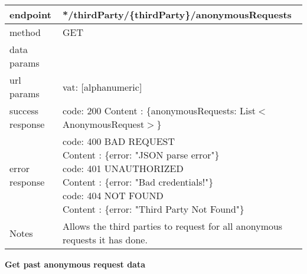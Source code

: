 	\begin{tabularx}{\linewidth}{| l| l }
		\hline
		endpoint & */thirdParty/\{thirdParty\}/anonymousRequests \\
		\hline
		method & GET \\
		\hline
		data params & \\
		\hline
		url params &
		\parbox{0.7\textwidth}{
			\bigskip
			vat: [alphanumeric]
			\bigskip
		} \\
		\hline
		success response &
		\parbox{0.7\textwidth}{
			\bigskip
			code: 200\\
			Content : \{anonymousRequests: List$<$AnonymousRequest$>$\}
			\bigskip
		} \\
		\hline
		error response &
		\parbox{0.7\textwidth}{
			\bigskip
			code: 400 BAD REQUEST \\
			Content : \{error: "JSON parse error"\}\\
			code: 401 UNAUTHORIZED \\
			Content : \{error: "Bad credentials!"\}\\
			code: 404 NOT FOUND \\
			Content : \{error: "Third Party Not Found"\}
			\bigskip
		} \\
		\hline
		Notes & 
		\parbox{0.7\textwidth}{
			\bigskip Allows the third parties to request for all anonymous requests it has done.
		\bigskip}  \\
		\hline
	\end{tabularx}
	
	\textbf{Get past anonymous request data} \\

